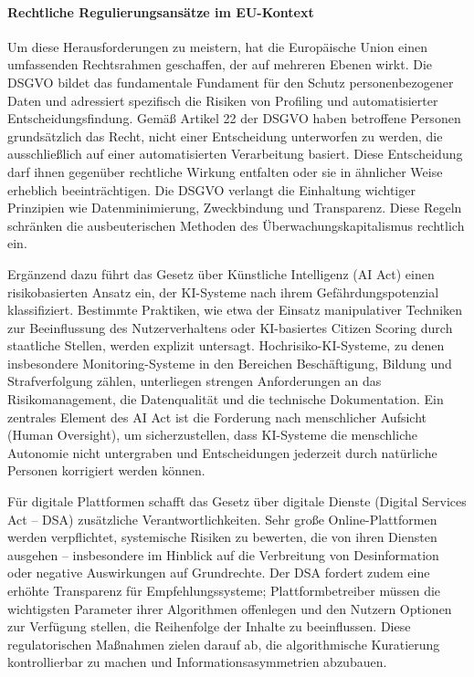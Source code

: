 \paragraph{Rechtliche Regulierungsansätze im EU-Kontext}

Um diese Herausforderungen zu meistern, hat die Europäische Union einen umfassenden Rechtsrahmen geschaffen, der auf mehreren Ebenen wirkt. Die \ac{DSGVO} bildet das fundamentale Fundament für den Schutz personenbezogener Daten und adressiert spezifisch die Risiken von Profiling und automatisierter Entscheidungsfindung. Gemäß Artikel 22 der \ac{DSGVO} haben betroffene Personen grundsätzlich das Recht, nicht einer Entscheidung unterworfen zu werden, die ausschließlich auf einer automatisierten Verarbeitung basiert. Diese Entscheidung darf ihnen gegenüber rechtliche Wirkung entfalten oder sie in ähnlicher Weise erheblich beeinträchtigen. Die \ac{DSGVO} verlangt die Einhaltung wichtiger Prinzipien wie Datenminimierung, Zweckbindung und Transparenz. Diese Regeln schränken die ausbeuterischen Methoden des Überwachungskapitalismus rechtlich ein.

Ergänzend dazu führt das Gesetz über Künstliche Intelligenz (\ac{AI} Act) einen risikobasierten Ansatz ein, der \ac{KI}-Systeme nach ihrem Gefährdungspotenzial klassifiziert. Bestimmte Praktiken, wie etwa der Einsatz manipulativer Techniken zur Beeinflussung des Nutzerverhaltens oder \ac{KI}-basiertes Citizen Scoring durch staatliche Stellen, werden explizit untersagt. Hochrisiko-\ac{KI}-Systeme, zu denen insbesondere Monitoring-Systeme in den Bereichen Beschäftigung, Bildung und Strafverfolgung zählen, unterliegen strengen Anforderungen an das Risikomanagement, die Datenqualität und die technische Dokumentation. Ein zentrales Element des \ac{AI} Act ist die Forderung nach menschlicher Aufsicht (Human Oversight), um sicherzustellen, dass \ac{KI}-Systeme die menschliche Autonomie nicht untergraben und Entscheidungen jederzeit durch natürliche Personen korrigiert werden können.

Für digitale Plattformen schafft das Gesetz über digitale Dienste (Digital Services Act -- DSA) zusätzliche Verantwortlichkeiten. Sehr große Online-Plattformen werden verpflichtet, systemische Risiken zu bewerten, die von ihren Diensten ausgehen -- insbesondere im Hinblick auf die Verbreitung von Desinformation oder negative Auswirkungen auf Grundrechte. Der DSA fordert zudem eine erhöhte Transparenz für Empfehlungssysteme; Plattformbetreiber müssen die wichtigsten Parameter ihrer Algorithmen offenlegen und den Nutzern Optionen zur Verfügung stellen, die Reihenfolge der Inhalte zu beeinflussen. Diese regulatorischen Maßnahmen zielen darauf ab, die algorithmische Kuratierung kontrollierbar zu machen und Informationsasymmetrien abzubauen.


